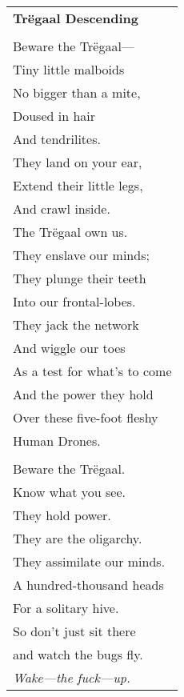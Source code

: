 \documentclass{article}
\begin{document}
\begin{center}
\begin{tabular}{l}
\textbf{Tr{\"e}gaal Descending} \\
\\
Beware the Tr{\"e}gaal--- \\
Tiny little malboids \\
No bigger than a mite, \\
Doused in hair \\
And tendrilites. \\
They land on your ear, \\
Extend their little legs, \\
And crawl inside. \\
The Tr{\"e}gaal own us. \\
They enslave our minds; \\
They plunge their teeth \\
Into our frontal-lobes. \\
They jack the network \\
And wiggle our toes \\
As a test for what's to come \\
And the power they hold \\
Over these five-foot fleshy \\
Human Drones. \\
\\
Beware the Tr{\"e}gaal. \\
Know what you see. \\
They hold power. \\
They are the oligarchy. \\
They assimilate our minds. \\
A hundred-thousand heads \\
For a solitary hive. \\
So don't just sit there \\
and watch the bugs fly. \\
\textit{Wake---the fuck---up.} \\

\end{tabular}
\end{center}
\end{document}
